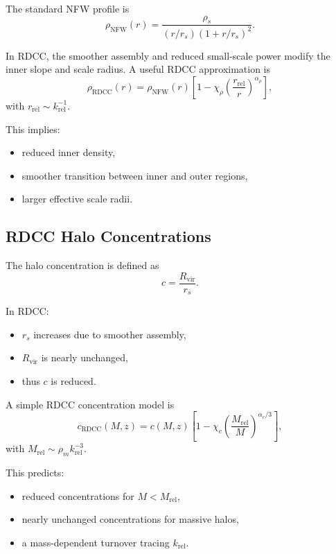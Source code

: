 \documentclass[11pt,a4paper]{article}
\begin{document}
The standard NFW profile is
\begin{equation}
\rho_{\mathrm{NFW}}(r)
=
\frac{\rho_{s}}{(r/r_{s})(1+r/r_{s})^{2}}.
\end{equation}

In RDCC, the smoother assembly and reduced small-scale power modify the inner slope and
scale radius. A useful RDCC approximation is
\begin{equation}
\rho_{\mathrm{RDCC}}(r)
=
\rho_{\mathrm{NFW}}(r)
\left[
1
-
\chi_{\rho}
\left(
\frac{r_{\mathrm{rel}}}{r}
\right)^{\alpha_{\rho}}
\right],
\end{equation}
with $r_{\mathrm{rel}} \sim k_{\mathrm{rel}}^{-1}$.

This implies:
\begin{itemize}
\item reduced inner density,
\item smoother transition between inner and outer regions,
\item larger effective scale radii.
\end{itemize}

\subsection{RDCC Halo Concentrations}

The halo concentration is defined as
\begin{equation}
c
=
\frac{R_{\mathrm{vir}}}{r_{s}}.
\end{equation}

In RDCC:
\begin{itemize}
\item $r_{s}$ increases due to smoother assembly,
\item $R_{\mathrm{vir}}$ is nearly unchanged,
\item thus $c$ is reduced.
\end{itemize}

A simple RDCC concentration model is
\begin{equation}
c_{\mathrm{RDCC}}(M,z)
=
c(M,z)
\left[
1
-
\chi_{c}
\left(
\frac{M_{\mathrm{rel}}}{M}
\right)^{\alpha_{c}/3}
\right],
\end{equation}
with $M_{\mathrm{rel}} \sim \rho_{m}k_{\mathrm{rel}}^{-3}$.

This predicts:
\begin{itemize}
\item reduced concentrations for $M < M_{\mathrm{rel}}$,
\item nearly unchanged concentrations for massive halos,
\item a mass-dependent turnover tracing $k_{\mathrm{rel}}$.
\end{itemize}
\end{document}
